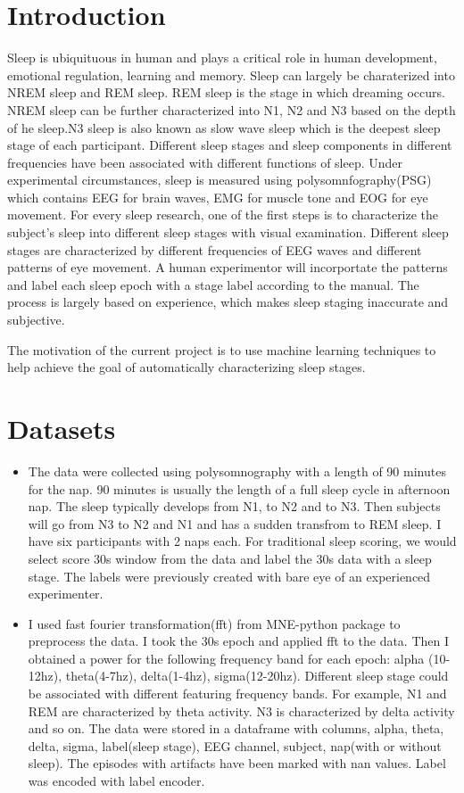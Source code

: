 \section*{Introduction}
Sleep is ubiquituous in human and plays a critical role in human development, emotional regulation, learning and memory. Sleep can largely be charaterized into NREM sleep and REM sleep. REM sleep is the stage in which dreaming occurs. NREM sleep can be further characterized into N1, N2 and N3 based on the depth of he sleep.N3 sleep is also known as slow wave sleep which is the deepest sleep stage of each participant.  Different sleep stages and sleep components in different frequencies have been associated with different functions of sleep. Under experimental circumstances, sleep is measured using polysomnfography(PSG) which contains EEG for brain waves, EMG for muscle tone and EOG for eye movement. For every sleep research, one of the first steps is to characterize the subject's sleep into different sleep stages with visual examination. Different sleep stages are characterized by different frequencies of EEG waves and different patterns of eye movement. A human experimentor will incorportate the patterns and label each sleep epoch with a stage label according to the manual\cite{sleepmanual}. The process is largely based on experience, which makes sleep staging inaccurate and subjective. 

The motivation of the current project is to use machine learning techniques to help achieve the goal of automatically characterizing sleep stages.  

\section*{Datasets}
\begin{itemize}
\item The data were collected using polysomnography with a length of 90 minutes for the nap. 90 minutes is usually the length of a full sleep cycle in afternoon nap. The sleep typically develops from N1, to N2 and to N3. Then subjects will go from N3 to N2 and N1 and has a sudden transfrom to REM sleep. I have six participants with 2 naps each. For traditional sleep scoring, we would select score 30s window from the data and label the 30s data with a sleep stage. The labels were previously created with bare eye of an experienced experimenter. 
\item I used fast fourier transformation(fft) from MNE-python package \cite{mne} to preprocess the data. I took the 30s epoch and applied fft to the data. Then I obtained a power for the following frequency band for each epoch: alpha (10-12hz), theta(4-7hz), delta(1-4hz), sigma(12-20hz). Different sleep stage could be associated with different featuring frequency bands. For example, N1 and REM are characterized by theta activity. N3 is characterized by delta activity and so on. The data were stored in a dataframe with columns, alpha, theta, delta, sigma, label(sleep stage), EEG channel, subject, nap(with or without sleep). The episodes with artifacts have been marked with nan values. Label was encoded with label encoder. 
\end{itemize}

